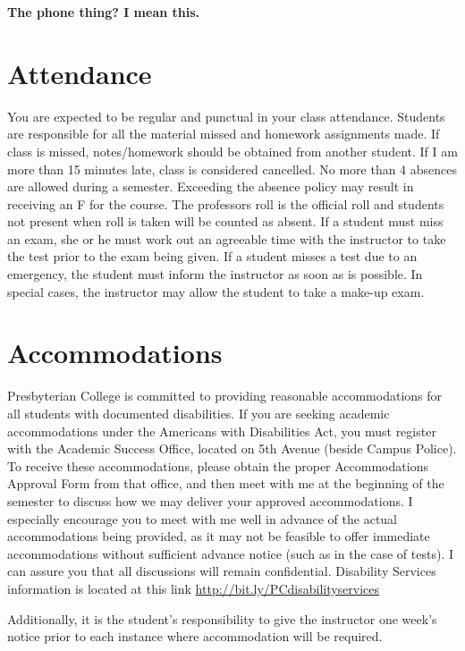 \documentclass[
]{book}
\theoremstyle{definition}
\theoremstyle{definition}
\theoremstyle{definition}
\theoremstyle{definition}
\theoremstyle{remark}
\begin{document}
\textbf{The phone thing? I mean this.}

\hypertarget{attendance}{%
\section{Attendance}\label{attendance}}

You are expected to be regular and punctual in your class attendance. Students are responsible for all the material missed and homework assignments made. If class is missed, notes/homework should be obtained from another student. If I am more than 15 minutes late, class is considered cancelled. No more than 4 absences are allowed during a semester. Exceeding the absence policy may result in receiving an F for the course. The professors roll is the official roll and students not present when roll is taken will be counted as absent. If a student must miss an exam, she or he must work out an agreeable time with the instructor to take the test prior to the exam being given. If a student misses a test due to an emergency, the student must inform the instructor as soon as is possible. In special cases, the instructor may allow the student to take a make-up exam.

\hypertarget{accommodations}{%
\section{Accommodations}\label{accommodations}}

Presbyterian College is committed to providing reasonable accommodations for all students with documented disabilities. If you are seeking academic accommodations under the Americans with Disabilities Act, you must register with the Academic Success Office, located on 5th Avenue (beside Campus Police). To receive these accommodations, please obtain the proper Accommodations Approval Form from that office, and then meet with me at the beginning of the semester to discuss how we may deliver your approved accommodations. I especially encourage you to meet with me well in advance of the actual accommodations being provided, as it may not be feasible to offer immediate accommodations without sufficient advance notice (such as in the case of tests). I can assure you that all discussions will remain confidential. Disability Services information is located at this link \url{http://bit.ly/PCdisabilityservices}

Additionally, it is the student's responsibility to give the instructor one week's notice prior to each instance where accommodation will be required.
\end{document}
